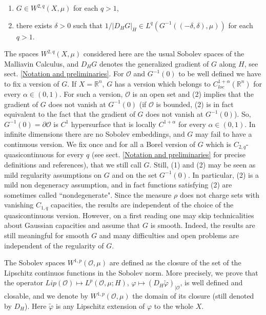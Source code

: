 \documentclass[reqno,twoside,12pt]{amsart}
\begin{document}
\begin{enumerate}
\item $G \in W^{2,q}(X , \mu)$ for each  $q>1$, 
\item there exists $  \delta >0$ such that $1/|D_HG |_H \in L^{q}(G^{-1}((-\delta, \delta), \mu))$ for each $q>1$. 
\end{enumerate}

The spaces $W^{2,q}(X , \mu)$ considered here are the usual Sobolev spaces of the Malliavin Calculus, and $D_HG $ denotes the generalized gradient of $G$ along $H$, see sect. \ref{Notation and preliminaries}.  For ${\mathcal O} $ and $G^{-1}(0)$ to be well defined we have to fix a version of $G$. If $X={\mathbb R}^n$, $G$ has a version which belongs to $C^{1+\alpha}_{loc}({\mathbb R}^n)$ for every $\alpha\in (0,1)$. For such a version, ${\mathcal O}$ is an open set and (2) implies that the gradient of $G$ does not vanish at $G^{-1}(0)$ (if ${\mathcal O}$ is bounded, (2) is in fact equivalent to the fact  that the gradient of $G$ does not vanish at $G^{-1}(0)$).  So, $G^{-1}(0)= \partial {\mathcal O}$ is $C^1$ hypersurface  that is locally $C^{1+\alpha}$ for every $\alpha\in (0,1)$.
In infinite dimensions there are no Sobolev embeddings, and $G$ may fail to have a continuous version. We fix once and for all a Borel version of $G$ which is  $C_{2,q}$-quasicontinuous for every $q$ (see sect. \ref{Notation and preliminaries} for precise definitions and references), that we still call $G$. Still, (1) and (2) may be seen as mild  regularity assumptions on $G$ and  on the set $G^{-1}(0)$. In particular, (2) is a mild non degeneracy assumption, and in fact functions satisfying (2) are sometimes called ``nondegenerate". Since the measure $\rho$ does not charge sets with vanishing $C_{1,q}$ capacities, the results are independent of the choice of the quasicontinuous version. However, on a first reading one may skip technicalities about Gaussian capacities and assume that $G$ is smooth. Indeed, the results are still meaningful for smooth $G$ and 
many difficulties and open problems are independent of the regularity of $G$. 

The Sobolev spaces $W^{1,p}({\mathcal O}, \mu)$ are defined as the closure of the set of the Lipschitz continuos functions in the Sobolev norm. 
More precisely, we prove that the operator $Lip({\mathcal O})\mapsto   L^p({\mathcal O}, \mu; H)$, $\varphi \mapsto  (D_H\widetilde{\varphi})_{|{\mathcal O}}$, is well defined and closable, and we denote by 
$W^{1,p}({\mathcal O}, \mu)$ the domain of its closure (still denoted by $D_H$).  Here $\widetilde{\varphi}$ is any Lipschitz extension of $\varphi $ to the whole $X$. 
\end{document}
